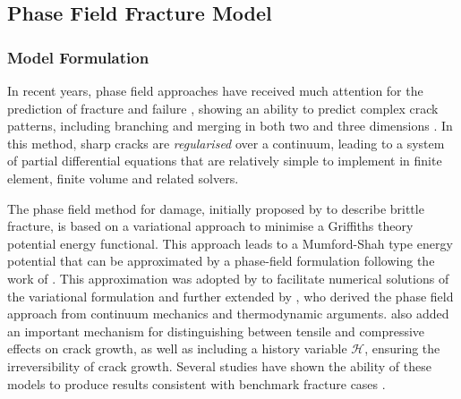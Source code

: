 \documentclass[sn-mathphys,Numbered]{sn-jnl}%
\begin{document}






\subsection{Phase Field Fracture Model}

\subsubsection{Model Formulation}
In recent years, phase field approaches have received much attention for the prediction of fracture and failure \cite{borden_phase-field_2012, miehe_phase_2010, ambati_phase-field_2015, borden_phase-field_2016, miehe_phase_2016, dittmann_variational_2018, samaniego_phase-field_2021}, showing an ability to predict complex crack patterns, including branching and merging in both two and three dimensions \cite{borden_phase-field_2012, miehe_phase_2010}.
In this method, sharp cracks are \emph{regularised} over a continuum, leading to a system of partial differential equations that are relatively simple to implement in finite element, finite volume and related solvers.

The phase field method for damage, initially proposed by \citet{francfort_revisiting_1998} to describe brittle fracture, is based on a variational approach to minimise a Griffiths theory potential energy functional. %
This approach leads to a Mumford-Shah \cite{mumford_optimal_1989} type energy potential that can be approximated by a phase-field formulation following the work of \citet{ambrosio_approximation_1990}.
This approximation was adopted by \citet{bourdin_time-discrete_2011} to facilitate numerical solutions of the variational formulation and further extended by \citet{miehe_phase_2010}, who derived the phase field approach from continuum mechanics and thermodynamic arguments.
\citet{miehe_phase_2010} also added an important mechanism for distinguishing between tensile and compressive effects on crack growth, as well as including a history variable $\mathcal{H}$, ensuring the irreversibility of crack growth.
Several studies have shown the ability of these models to produce results consistent with benchmark fracture cases \cite{borden_phase-field_2012,miehe_phase_2010}.
\end{document}
